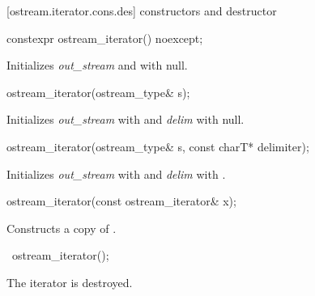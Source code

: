 [ostream.iterator.cons.des]{ constructors and destructor}

\begin{addedblock}
%
\begin{itemdecl}
constexpr ostream_iterator() noexcept;
\end{itemdecl}

\begin{itemdescr}
\pnum
\effects
Initializes \textit{out_stream} and  with null.
\end{itemdescr}
\end{addedblock}

%
\begin{itemdecl}
ostream_iterator(ostream_type& s);
\end{itemdecl}

\begin{itemdescr}
\pnum
\effects
Initializes \textit{out_stream} with  and \textit{delim} with null.
\end{itemdescr}


%
\begin{itemdecl}
ostream_iterator(ostream_type& s, const charT* delimiter);
\end{itemdecl}

\begin{itemdescr}
\pnum
\effects
Initializes \textit{out_stream} with  and \textit{delim} with .
\end{itemdescr}


%
\begin{itemdecl}
ostream_iterator(const ostream_iterator& x);
\end{itemdecl}

\begin{itemdescr}
\pnum
\effects
Constructs a copy of .
\end{itemdescr}

%
\begin{itemdecl}
~ostream_iterator();
\end{itemdecl}

\begin{itemdescr}
\pnum
\effects
The iterator is destroyed.
\end{itemdescr}


